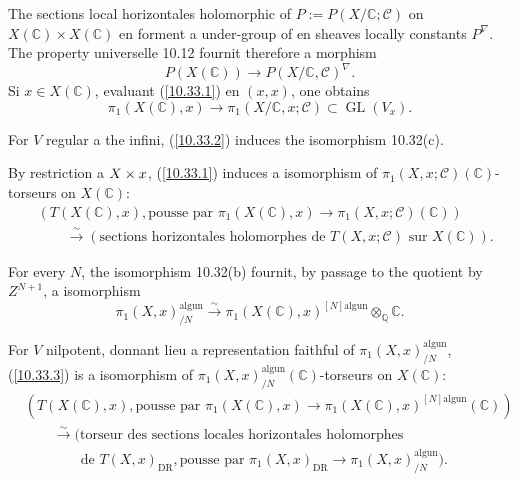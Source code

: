 \documentclass[12pt,a4paper]{article}
\theoremstyle{plain}
\theoremstyle{definition}
\theoremstyle{remark}
\DeclareMathOperator{\GL}{GL}
\newcommand{\Q}{\mathbb{Q}}
\newcommand{\C}{\mathbb{C}}
\newcommand{\DR}{\mathrm{DR}}
\newcommand{\alg}{\mathrm{alg}}
\newcommand{\un}{\mathrm{un}}
\begin{document}
The sections local horizontales holomorphic of $P := P(X/\C; \mathcal{C})$ on $X(\C) \times X(\C)$ en forment a under-group of en sheaves locally constants $P^\nabla$. The property universelle 10.12 fournit therefore a morphism
\begin{equation}\label{10.33.1}
P(X(\C)) \longrightarrow P(X/\C, \mathcal{C})^\nabla. \tag{10.33.1}
\end{equation}
Si $x \in X(\C)$, evaluant (\ref{10.33.1}) en $(x, x)$, one obtains
\begin{equation}\label{10.33.2}
\pi_1(X(\C), x) \longrightarrow \pi_1(X/\C, x; \mathcal{C}) \subset \GL(V_x). \tag{10.33.2}
\end{equation}

For $V$ regular a the infini, (\ref{10.33.2}) induces the isomorphism 10.32(c).

By restriction a $X \times \\{x\\}$, (\ref{10.33.1}) induces a isomorphism of $\pi_1(X, x; \mathcal{C})(\C)$-torseurs on $X(\C)$:
\begin{equation}\label{10.33.3}
\begin{aligned}
&(T(X(\C), x), \text{pousse par } \pi_1(X(\C), x) \to \pi_1(X, x; \mathcal{C})(\C)) \\
&\qquad \xrightarrow{\sim} (\text{sections horizontales holomorphes de } T(X, x; \mathcal{C}) \text{ sur } X(\C)).
\end{aligned} \tag{10.33.3}
\end{equation}

For every $N$, the isomorphism 10.32(b) fournit, by passage to the quotient by $Z^{N+1}$, a isomorphism
\begin{equation}\label{10.33.4}
\pi_1(X, x)^{\alg \un}_{/N} \xrightarrow{\sim} \pi_1(X(\C), x)^{[N] \alg \un} \otimes_{\Q} \C. \tag{10.33.4}
\end{equation}

For $V$ nilpotent, donnant lieu a representation faithful of $\pi_1(X, x)^{\alg \un}_{/N}$, (\ref{10.33.3}) is a isomorphism of $\pi_1(X, x)^{\alg \un}_{/N}(\C)$-torseurs on $X(\C)$:
\begin{equation}\label{10.33.5}
\begin{aligned}
&(T(X(\C), x), \text{pousse par } \pi_1(X(\C), x) \to \pi_1(X(\C), x)^{[N] \alg \un}(\C)) \\
&\qquad \xrightarrow{\sim} (\text{torseur des sections locales horizontales holomorphes} \\
&\qquad\qquad \text{de } T(X, x)_{\DR}, \text{pousse par } \pi_1(X, x)_{\DR} \to \pi_1(X, x)^{\alg \un}_{/N}).
\end{aligned} \tag{10.33.5}
\end{equation}
\end{document}
